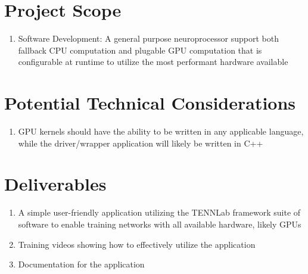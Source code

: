 \documentclass[11pt]{article}
\begin{document}
\section{Project Scope}
\label{sec:org4be1323}
\begin{enumerate}
\item Software Development: A general purpose neuroprocessor support both fallback CPU computation and plugable GPU computation that is configurable at runtime to utilize the most performant hardware available
\end{enumerate}
\section{Potential Technical Considerations}
\label{sec:orgefbe1c7}
\begin{enumerate}
\item GPU kernels should have the ability to be written in any applicable language, while the driver/wrapper application will likely be written in C++
\end{enumerate}
\section{Deliverables}
\label{sec:org68b0ff5}
\begin{enumerate}
\item A simple user-friendly application utilizing the TENNLab framework suite of software to enable training networks with all available hardware, likely GPUs
\item Training videos showing how to effectively utilize the application
\item Documentation for the application
\end{enumerate}
\end{document}
